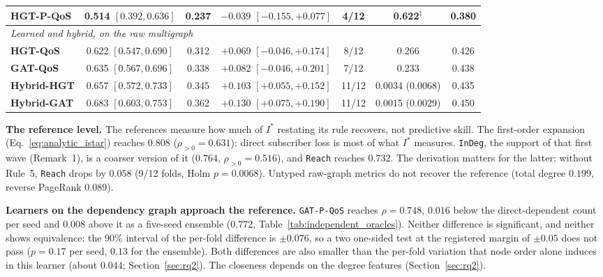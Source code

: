 \documentclass[preprint,3p]{elsarticle}
\begin{document}
\begin{table}[htbp]
{\begin{tabular}{lcccccc}
\textbf{HGT-P-QoS} & 0.514 $[0.392, 0.636]$ & 0.237 & $-0.039$ $[-0.155, +0.077]$ & 4/12 & 0.622$^\ddagger$ & 0.380 \\
\midrule
\multicolumn{7}{l}{\textit{Learned and hybrid, on the raw multigraph}} \\
\textbf{HGT-QoS} & 0.622 $[0.547, 0.690]$ & 0.312 & $+0.069$ $[-0.046, +0.174]$ & 8/12 & 0.266 & 0.426 \\
\textbf{GAT-QoS} & 0.635 $[0.567, 0.696]$ & 0.338 & $+0.082$ $[-0.046, +0.201]$ & 7/12 & 0.233 & 0.438 \\
\textbf{Hybrid-HGT} & 0.657 $[0.572, 0.733]$ & 0.345 & $+0.103$ $[+0.055, +0.152]$ & 11/12 & 0.0034 (0.0068) & 0.435 \\
\textbf{Hybrid-GAT} & 0.683 $[0.603, 0.753]$ & 0.362 & $+0.130$ $[+0.075, +0.190]$ & 11/12 & 0.0015 (0.0029) & 0.450 \\
\bottomrule
\end{tabular}%
}
\end{table}

\noindent\textbf{The reference level.} The references measure how much of $I^*$ restating its rule recovers, not predictive skill. The first-order expansion (Eq.~\eqref{eq:analytic_istar}) reaches $0.808$ ($\rho_{>0} = 0.631$): direct subscriber loss is most of what $I^*$ measures. \texttt{InDeg}, the support of that first wave (Remark~1), is a coarser version of it ($0.764$, $\rho_{>0} = 0.516$), and \texttt{Reach} reaches $0.732$. The derivation matters for the latter: without Rule~5, \texttt{Reach} drops by $0.058$ (9/12 folds, Holm $p = 0.0068$). Untyped raw-graph metrics do not recover the reference (total degree $0.199$, reverse PageRank $0.089$).

\noindent\textbf{Learners on the dependency graph approach the reference.} \texttt{GAT-P-QoS} reaches $\rho = 0.748$, $0.016$ below the direct-dependent count per seed and $0.008$ above it as a five-seed ensemble ($0.772$, Table~\ref{tab:independent_oracles}). Neither difference is significant, and neither shows equivalence: the $90\%$ interval of the per-fold difference is $\pm 0.076$, so a two one-sided test at the registered margin of $\pm 0.05$ does not pass ($p = 0.17$ per seed, $0.13$ for the ensemble). Both differences are also smaller than the per-fold variation that node order alone induces in this learner (about $0.044$; Section~\ref{sec:rq2}). The closeness depends on the degree features (Section~\ref{sec:rq2}).
\end{document}
